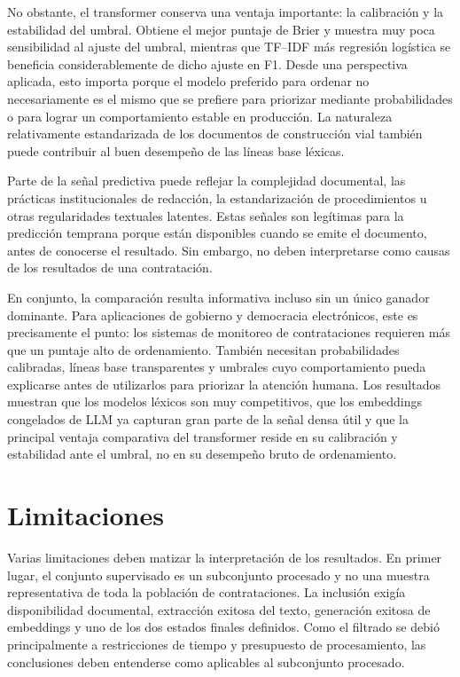 No obstante, el transformer conserva una ventaja importante: la calibración y la estabilidad del umbral. Obtiene el mejor puntaje de Brier y muestra muy poca sensibilidad al ajuste del umbral, mientras que TF--IDF más regresión logística se beneficia considerablemente de dicho ajuste en F1. Desde una perspectiva aplicada, esto importa porque el modelo preferido para ordenar no necesariamente es el mismo que se prefiere para priorizar mediante probabilidades o para lograr un comportamiento estable en producción. La naturaleza relativamente estandarizada de los documentos de construcción vial también puede contribuir al buen desempeño de las líneas base léxicas.

Parte de la señal predictiva puede reflejar la complejidad documental, las prácticas institucionales de redacción, la estandarización de procedimientos u otras regularidades textuales latentes. Estas señales son legítimas para la predicción temprana porque están disponibles cuando se emite el documento, antes de conocerse el resultado. Sin embargo, no deben interpretarse como causas de los resultados de una contratación.

En conjunto, la comparación resulta informativa incluso sin un único ganador dominante. Para aplicaciones de gobierno y democracia electrónicos, este es precisamente el punto: los sistemas de monitoreo de contrataciones requieren más que un puntaje alto de ordenamiento. También necesitan probabilidades calibradas, líneas base transparentes y umbrales cuyo comportamiento pueda explicarse antes de utilizarlos para priorizar la atención humana. Los resultados muestran que los modelos léxicos son muy competitivos, que los embeddings congelados de LLM ya capturan gran parte de la señal densa útil y que la principal ventaja comparativa del transformer reside en su calibración y estabilidad ante el umbral, no en su desempeño bruto de ordenamiento.

\chapter{Limitaciones}
Varias limitaciones deben matizar la interpretación de los resultados. En primer lugar, el conjunto supervisado es un subconjunto procesado y no una muestra representativa de toda la población de contrataciones. La inclusión exigía disponibilidad documental, extracción exitosa del texto, generación exitosa de embeddings y uno de los dos estados finales definidos. Como el filtrado se debió principalmente a restricciones de tiempo y presupuesto de procesamiento, las conclusiones deben entenderse como aplicables al subconjunto procesado.

